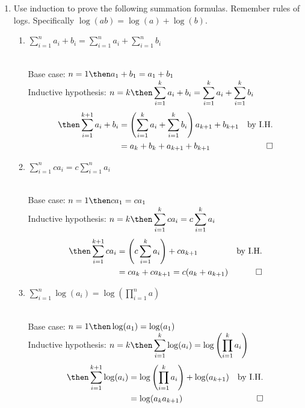 \documentclass[basic, header]{nosvagor-notes}
\begin{document}
\begin{enumerate}[itemsep=4em]

  \item Use induction to prove the following summation formulas. Remember rules
    of logs. Specifically \(\log(ab) = \log(a) + \log(b)\).
    \begin{enumerate}[leftmargin=2em]
      \item \(\displaystyle \sum_{i=1}^{n} a_i + b_i = \sum_{i=1}^{n} a_i + \sum_{i=1}^{n} b_i  \)

        \\
        Base case: \(n = 1 \then
          a_1 + b_1 = a_1 + b_1\) \\
        Inductive hypothesis: \(\displaystyle
        n = k \then
        \sum_{i=1}^{k} a_i + b_i = \sum_{i=1}^{k} a_i + \sum_{i=1}^{k} b_i
        \)
        \begin{align*}
          \then
          \sum_{i=1}^{k+1} a_i + b_i
          &= \left(\sum_{i=1}^{k} a_i + \sum_{i=1}^{k} b_i\right) a_{k+1} + b_{k+1}
          & \text{by I.H.} \\
          &= a_k + b_k + a_{k+1} + b_{k+1} & \qed
        \end{align*}

      \item \(\displaystyle \sum_{i=1}^{n}ca_i = c \sum_{i=1}^{n} a_i \)

        \\
        Base case: \(n = 1 \then ca_1 = ca_1\)\\
        Inductive hypothesis: \(\displaystyle n = k
        \then
        \sum_{i=1}^{k} ca_i = c \sum_{i=1}^{k} a_i\)
        \begin{align*}
          \then \sum_{i=1}^{k+1} ca_i
           &= \left( c\sum_{i=1}^{k} a_i \right) + ca_{k+1} & \text{by I.H.}\\
           &= ca_k + ca_{k+1}  = c(a_k + a_{k+1} ) & \qed
        \end{align*}

      \item \(\displaystyle \sum_{i=1}^{n} \log(a_i) = \log \left( \prod_{i=1}^{n} a \right) \)

        \\
        Base case: \(n=1 \then \log(a_1) = \log(a_1)\) \\
        Inductive hypothesis: \(\displaystyle n= k
        \then
        \sum_{i=1}^{k} \log(a_i) = \log\left( \prod_{i=1}^{k} a_i  \right) \)
        \begin{align*}
          \then \sum_{i=1}^{k+1} \log(a_i) &= \log\left( \prod_{i=1}^{k} a_i  \right) + \log(a_{k+1} )
          & \text{by I.H.} \\
          &= \log(a_k a_{k+1} ) & \qed
        \end{align*}


\end{enumerate}
\end{enumerate}
\end{document}
